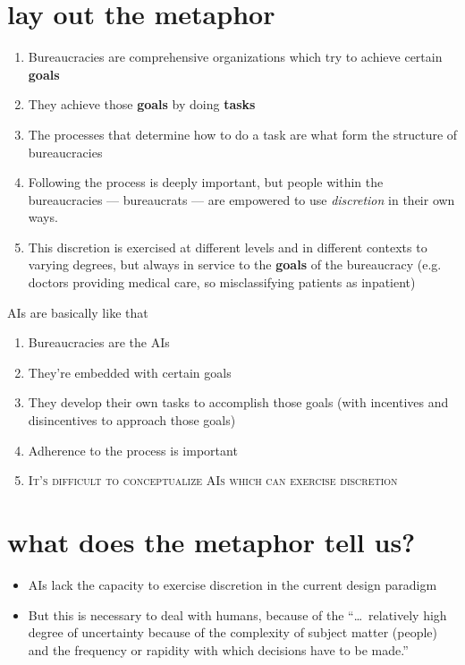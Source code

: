 \documentclass[10pt]{article}
\begin{document}
  \section{lay out the metaphor}
    \begin{enumerate}
      \item Bureaucracies are comprehensive organizations which try to achieve certain \textbf{goals}
      \item They achieve those \textbf{goals} by doing \textbf{tasks}
      \item The processes that determine how to do a task are what form the structure of bureaucracies
      \item Following the process is deeply important, but people within the bureaucracies
      --- bureaucrats ---
      are empowered to use \textit{discretion} in their own ways.
      \item This discretion is exercised at different levels and in different contexts to varying degrees, but
      always in service to the \textbf{goals} of the bureaucracy
      (e.g. doctors providing medical care, so misclassifying patients as inpatient)
    \end{enumerate}
    AIs are basically like that
    \begin{enumerate}
      \item Bureaucracies are the AIs
      \item They're embedded with certain goals
      \item They develop their own tasks to accomplish those goals (with incentives and disincentives to approach those goals)
      \item Adherence to the process is important
      \item \textsc{It's difficult to conceptualize AIs which can exercise discretion}
    \end{enumerate}
  
  \section{what does the metaphor tell us?}
    \begin{itemize}
      \item AIs lack the capacity to exercise discretion in the current design paradigm
      \item But this is necessary to deal with humans, because of the ``\dots~relatively high degree of uncertainty because of the complexity of subject matter (people) and the frequency or rapidity with which decisions have to be made.''
    \end{itemize}
  
\end{document}
